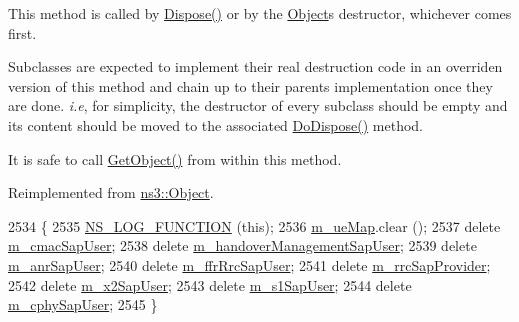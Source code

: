 This method is called by \hyperlink{classns3_1_1Object_aa90ae598863f6c251cdab3c3722afdaf}{Dispose()} or by the \hyperlink{classns3_1_1Object}{Object}\textquotesingle{}s destructor, whichever comes first.

Subclasses are expected to implement their real destruction code in an overriden version of this method and chain up to their parent\textquotesingle{}s implementation once they are done. {\itshape i.\+e}, for simplicity, the destructor of every subclass should be empty and its content should be moved to the associated \hyperlink{classns3_1_1LteEnbRrc_a6988f943aec1c62cd9e3863b5cd050e0}{Do\+Dispose()} method.

It is safe to call \hyperlink{classns3_1_1Object_a13e18c00017096c8381eb651d5bd0783}{Get\+Object()} from within this method. 

Reimplemented from \hyperlink{classns3_1_1Object_a475d429a75d302d4775f4ae32479b287}{ns3\+::\+Object}.


\begin{DoxyCode}
2534 \{
2535   \hyperlink{log-macros-disabled_8h_a90b90d5bad1f39cb1b64923ea94c0761}{NS\_LOG\_FUNCTION} (\textcolor{keyword}{this});
2536   \hyperlink{classns3_1_1LteEnbRrc_a7cf28bbc2890b86221ed1d901da8ad73}{m\_ueMap}.clear ();
2537   \textcolor{keyword}{delete} \hyperlink{classns3_1_1LteEnbRrc_a0774c35dec69a3c8576b19b7f46d475b}{m\_cmacSapUser};
2538   \textcolor{keyword}{delete} \hyperlink{classns3_1_1LteEnbRrc_a40201970adca4d2986f20dbd66aea33a}{m\_handoverManagementSapUser};
2539   \textcolor{keyword}{delete} \hyperlink{classns3_1_1LteEnbRrc_a73755edf0b4ef491bb008a2c80564c68}{m\_anrSapUser};
2540   \textcolor{keyword}{delete} \hyperlink{classns3_1_1LteEnbRrc_a27f4337867e3e886bc1caad3c010698f}{m\_ffrRrcSapUser};
2541   \textcolor{keyword}{delete} \hyperlink{classns3_1_1LteEnbRrc_aee933dd53de1635189062fe29a04a1e3}{m\_rrcSapProvider};
2542   \textcolor{keyword}{delete} \hyperlink{classns3_1_1LteEnbRrc_abe194d716748f1d4579731c60cd8022c}{m\_x2SapUser};
2543   \textcolor{keyword}{delete} \hyperlink{classns3_1_1LteEnbRrc_af62e6e3a3b5d61968b03900b87387959}{m\_s1SapUser};
2544   \textcolor{keyword}{delete} \hyperlink{classns3_1_1LteEnbRrc_ad598b8b39b50e915d0e1069d4b0e5dcd}{m\_cphySapUser};
2545 \}
\end{DoxyCode}
